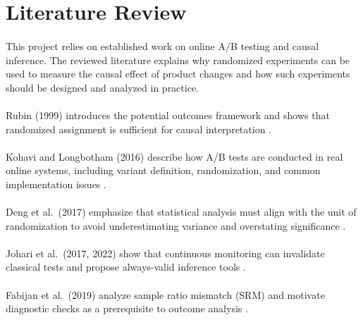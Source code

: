 \documentclass[a4paper,12pt]{extarticle}
\numberwithin{equation}{section}
\begin{document}
\clearpage

\section{Literature Review}

\paragraph{}This project relies on established work on online A/B testing and causal inference.
The reviewed literature explains why randomized experiments can be used to measure
the causal effect of product changes and how such experiments should be designed
and analyzed in practice.

\paragraph{}Rubin (1999) introduces the potential outcomes framework and shows that randomized
assignment is sufficient for causal interpretation \cite{rubin1999teaching}.

\paragraph{}Kohavi and Longbotham (2016) describe how A/B tests are conducted in real online
systems, including variant definition, randomization, and common implementation issues
\cite{kohavi2016online}.

\paragraph{}Deng et al.\ (2017) emphasize that statistical analysis must align with the unit of
randomization to avoid underestimating variance and overstating significance \cite{deng2017trustworthy}.

\paragraph{}Johari et al.\ (2017, 2022) show that continuous monitoring can invalidate classical
tests and propose always-valid inference tools \cite{johari2017peeking,johari2022always}.

\paragraph{}Fabijan et al.\ (2019) analyze sample ratio mismatch (SRM) and motivate diagnostic
checks as a prerequisite to outcome analysis \cite{fabijan2019srm}.
\end{document}
